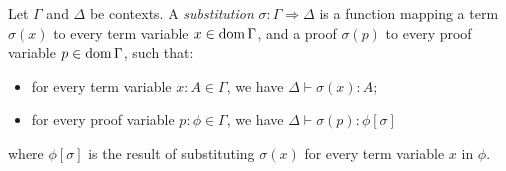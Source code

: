 Let $\Gamma$ and $\Delta$ be contexts.  A \emph{substitution} $\sigma : \Gamma \Rightarrow \Delta$
is a function mapping a term $\sigma(x)$ to every term variable $x \in \operatorname{dom} \Gamma$, and a proof $\sigma(p)$ to
every proof variable $p \in \operatorname{dom} \Gamma$, such that:
\begin{itemize}
\item
for every term variable $x : A \in \Gamma$, we have $\Delta \vdash \sigma(x) : A$;
\item
for every proof variable $p : \phi \in \Gamma$, we have $\Delta \vdash \sigma(p) : \phi [ \sigma ]$
\end{itemize}
where $\phi [ \sigma ]$ is the result of substituting $\sigma(x)$ for every term variable $x$ in $\phi$.

\begin{code}%
\>  \AgdaSymbol{:}  \AgdaSymbol{\{}\AgdaSymbol{\}} \AgdaSymbol{\{}\AgdaSymbol{\}}            \<%
\end{code}

